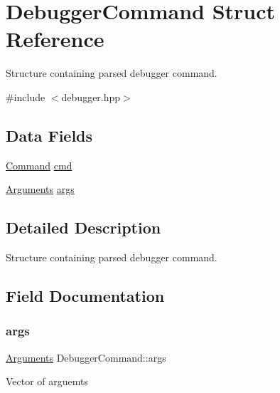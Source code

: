\hypertarget{structDebuggerCommand}{}\section{Debugger\+Command Struct Reference}
\label{structDebuggerCommand}


Structure containing parsed debugger command.  




{\ttfamily \#include $<$debugger.\+hpp$>$}

\subsection*{Data Fields}
\begin{DoxyCompactItemize}
\item 
\mbox{\hyperlink{debugger_8hpp_a2afce0a47a93eee73a314d53e4890153}{Command}} \mbox{\hyperlink{structDebuggerCommand_a9f3fa447fdedc63659cc3dd75e6bbd41}{cmd}}
\item 
\mbox{\hyperlink{debugger_8hpp_aca71abe8694d19d25f9f855f89eea3ce}{Arguments}} \mbox{\hyperlink{structDebuggerCommand_af6535e5e0020c0423e4d4b02c4f20867}{args}}
\end{DoxyCompactItemize}


\subsection{Detailed Description}
Structure containing parsed debugger command. 

\subsection{Field Documentation}
\mbox{\label{structDebuggerCommand_af6535e5e0020c0423e4d4b02c4f20867}} 
\subsubsection{\texorpdfstring{args}{args}}
{\footnotesize\ttfamily \mbox{\hyperlink{debugger_8hpp_aca71abe8694d19d25f9f855f89eea3ce}{Arguments}} Debugger\+Command\+::args}

Vector of arguemts \mbox{\label{structDebuggerCommand_a9f3fa447fdedc63659cc3dd75e6bbd41}} 
